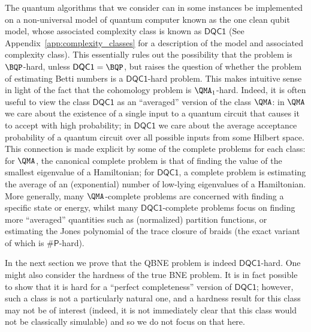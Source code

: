 \documentclass[11pt]{article}
\numberwithin{equation}{section}
\newcommand{\DQC}{\mathsf{DQC1}}
\renewcommand\( {\left(}
\renewcommand\) {\right)}
\newcommand{\sharpP}{\mathsf{\#P}}
\begin{document}
The quantum algorithms that we consider can in some instances be implemented on a non-universal model of quantum computer known as the one clean qubit model, whose associated complexity class is known as $\DQC$ (See Appendix~\ref{app:complexity_classes} for a description of the model and associated complexity class). This essentially rules out the possibility that the problem is $\BQP$-hard, unless $\DQC = \BQP$, but raises the question of whether the problem of estimating Betti numbers is a $\DQC$-hard problem. This makes intuitive sense in light of the fact that the cohomology problem is $\QMA_1$-hard. Indeed, it is often useful to view the class $\DQC$ as an ``averaged'' version of the class $\QMA$: in $\QMA$ we care about the existence of a single input to a quantum circuit that causes it to accept with high probability; in $\DQC$ we care about the average acceptance probability of a quantum circuit over all possible inputs from some Hilbert space. This connection is made explicit by some of the complete problems for each class: for $\QMA$, the canonical complete problem is that of finding the value of the smallest eigenvalue of a Hamiltonian; for $\DQC$, a complete problem is estimating the average of an (exponential) number of low-lying eigenvalues of a Hamiltonian. More generally, many $\QMA$-complete problems are concerned with finding a specific state or energy, whilst many $\DQC$-complete problems focus on finding more ``averaged'' quantities such as (normalized) partition functions, or estimating the Jones polynomial of the trace closure of braids (the exact variant of which is $\sharpP$-hard).

In the next section we prove that the {\sc QBNE} problem is indeed $\DQC$-hard. One might also consider the hardness of the true {\sc BNE} problem. It is in fact possible to show that it is hard for a ``perfect completeness'' version of $\DQC$; however, such a class is not a particularly natural one, and a hardness result for this class may not be of interest (indeed, it is not immediately clear that this class would not be classically simulable) and so we do not focus on that here. 

\ 
\end{document}
